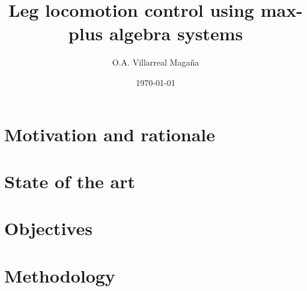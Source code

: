 \documentclass[a4paper]{article}
\title{Leg locomotion control using max-plus algebra systems}
\author{O.A. Villarreal Maga\~na}
\date{\today}
\begin{document}
\maketitle
\thispagestyle{empty}
\setcounter{page}{1}


\thispagestyle{empty} 
\thispagestyle{empty}




 
 
%

%



\section{Motivation and rationale}
 

\section{State of the art}
 

\section{Objectives}
 

\section{Methodology}
 
\end{document}
